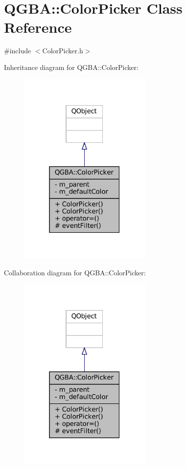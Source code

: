 \hypertarget{class_q_g_b_a_1_1_color_picker}{}\section{Q\+G\+BA\+:\+:Color\+Picker Class Reference}
\label{class_q_g_b_a_1_1_color_picker}


{\ttfamily \#include $<$Color\+Picker.\+h$>$}



Inheritance diagram for Q\+G\+BA\+:\+:Color\+Picker\+:
\nopagebreak
\begin{figure}[H]
\begin{center}
\leavevmode
\includegraphics[width=187pt]{class_q_g_b_a_1_1_color_picker__inherit__graph}
\end{center}
\end{figure}


Collaboration diagram for Q\+G\+BA\+:\+:Color\+Picker\+:
\nopagebreak
\begin{figure}[H]
\begin{center}
\leavevmode
\includegraphics[width=187pt]{class_q_g_b_a_1_1_color_picker__coll__graph}
\end{center}
\end{figure}
